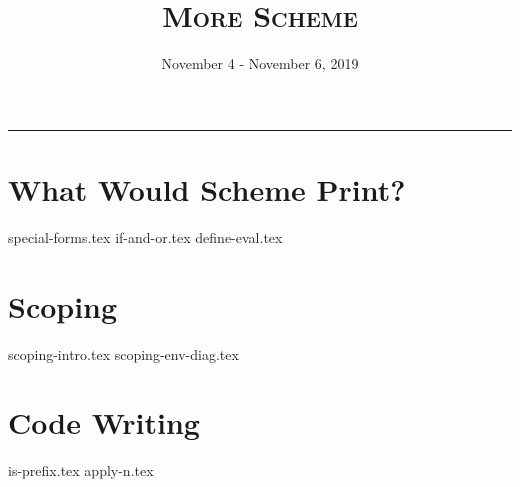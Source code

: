 \documentclass{exam}
\title{\textsc{More Scheme}}
\date{November 4 - November 6, 2019}
\begin{document}
\maketitle
\rule{\textwidth}{0.15em}
\fontsize{12}{15}\selectfont

\begin{questions}
\section{What Would Scheme Print?}
{special-forms.tex}
{if-and-or.tex}
{define-eval.tex}


\section{Scoping}
{scoping-intro.tex}
{scoping-env-diag.tex}


\section{Code Writing}
{is-prefix.tex}
{apply-n.tex}

\end{questions}
\end{document}
